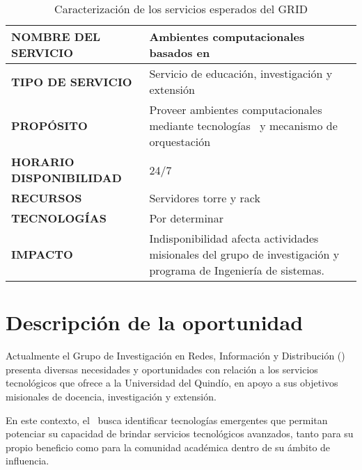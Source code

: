\begin{table}[H]
	\centering
	\renewcommand{\arraystretch}{1.2}
	\setlength{\tabcolsep}{3pt}
	\tiny
	\begin{tabularx}{\textwidth}{|>{\raggedright\arraybackslash}p{}|X|}
		\hline
		\textbf{NOMBRE DEL SERVICIO}    & Ambientes computacionales basados en \VBC                                                                       \\
		\hline
		\textbf{TIPO DE SERVICIO}       & Servicio de educación, investigación y extensión                                                                \\
		\hline
		\textbf{PROPÓSITO}              & Proveer ambientes computacionales mediante tecnologías \VBC\ y mecanismo de orquestación                        \\
		\hline
		\textbf{HORARIO DISPONIBILIDAD} & 24/7                                                                                                            \\
		\hline
		\textbf{RECURSOS}               & Servidores torre y rack                                                                                         \\
		\hline
		\textbf{TECNOLOGÍAS}            & Por determinar                                                                                                  \\
		\hline
		\textbf{IMPACTO}                & Indisponibilidad afecta actividades misionales del grupo de investigación y programa de Ingeniería de sistemas. \\
		\hline
	\end{tabularx}
	\caption{Caracterización de los servicios esperados del GRID}\label{tab:servicios-esperados}
\end{table}

\section{Descripción de la oportunidad}

Actualmente el Grupo de Investigación en Redes, Información y Distribución (\GRID) presenta diversas necesidades y oportunidades con relación a los servicios tecnológicos que ofrece a la Universidad del Quindío, en apoyo a sus objetivos misionales de docencia, investigación y extensión.

En este contexto, el \GRID\ busca identificar tecnologías emergentes que permitan potenciar su capacidad de brindar servicios tecnológicos avanzados, tanto para su propio beneficio como para la comunidad académica dentro de su ámbito de influencia.

